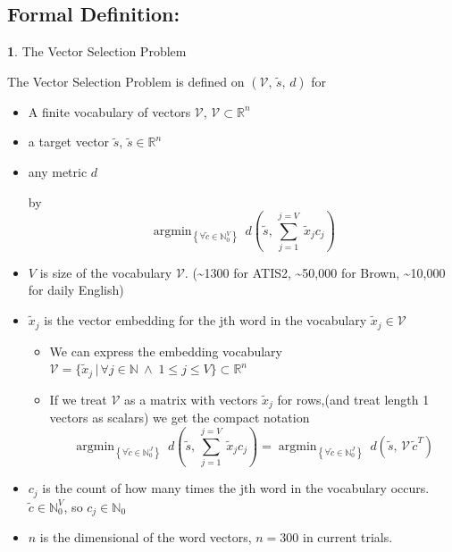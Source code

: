 \documentclass[]{scrartcl}
\numberwithin{equation}{section}
\numberwithin{figure}{section}
\theoremstyle{plain}
\theoremstyle{definition}
\newtheorem{defn}[thm]{\protect\definitionname}
\providecommand{\definitionname}{Definition}
\DeclareMathOperator*{\argmin}{argmin}
\begin{document}
\subsection{Formal Definition: }
\begin{defn} {The Vector Selection Problem}

	
	The Vector Selection Problem is defined on $(\mathcal{V},\,\tilde{s},\,d)$ for
	\begin{itemize}
		\item A finite vocabulary of vectors $\mathcal{V}$, $\mathcal{V}\subset\mathbb{R}^{n}$
		\item a target vector $\tilde{s}$, $\tilde{s}\in\mathbb{R}^{n}$
		\item any metric $d$ 
		
		by
		\[
		\argmin_{\left\{ \forall\tilde{c}\in\mathbb{N}_{0}^{V}\right\} }\:d(\tilde{s},\,\sum_{j=1}^{j=V}\:\tilde{x}_{j}c_{j})
		\]
		
		\medskip{}
				
		\item $V$ is size of the vocabulary $\mathcal{V}$. (\textasciitilde{}1300
		for ATIS2, \textasciitilde{}50,000 for Brown, \textasciitilde{}10,000
		for daily English) 
		\item $\tilde{x}_{j}$ is the vector embedding for the jth word in the vocabulary
		$\tilde{x}_{j}\in\mathcal{V}$ 
		
		\begin{itemize}
			\item We can express the embedding vocabulary $\mathcal{V}=\{\tilde{x}_{j}\,|\,\forall j\in\mathbb{N}\:\wedge\;1\le j\le V\}\subset\mathbb{R}^{n}$
			\item If we treat $\mathcal{V}$ as a matrix with vectors $\tilde{x}_{j}$
			for rows,(and treat length 1 vectors as scalars) we get the compact
			notation 
			\[
			\argmin_{\left\{ \forall\tilde{c}\in\mathbb{N}_{0}^{J}\right\} }\:d(\tilde{s},\,\sum_{j=1}^{j=V}\:\tilde{x}_{j}c_{j})=\argmin_{\left\{ \forall\tilde{c}\in\mathbb{N}_{0}^{J}\right\} }\:d(\tilde{s},\,\mathcal{V}\,\tilde{c}^{T})
			\]
			
		\end{itemize}
		\item $c_{j}$ is the count of how many times the jth word in the vocabulary
		occurs. $\tilde{c}\in\mathbb{N}_{0}^{V}$, so $c_{j}\in\mathbb{N}_{0}$
		\item $n$ is the dimensional of the word vectors, $n=300$ in current trials. \end{itemize}
\end{defn}
\end{document}
